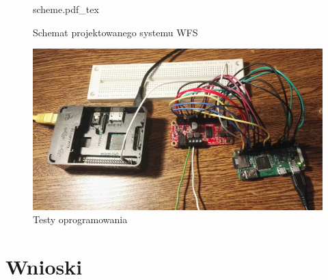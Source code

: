 \documentclass[12pt]{oska}
\begin{document}
\begin{figure}[!tbh]
  \centering
  {scheme.pdf_tex}
  \caption{Schemat projektowanego systemu WFS}
  \label{fig:schemat}
\end{figure}

\begin{figure}[!tbh]
  \centering
  \includegraphics[width=\textwidth]{./bitgraphics/testy.jpg}
  \caption{Testy oprogramowania}
  \label{fig:testy}
\end{figure}

\section{Wnioski}


\printbibliography
\end{document}
